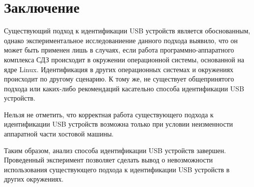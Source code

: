 \section{Заключение}
Существующий подход к идентификации USB устройств является обоснованным, однако экспериментальное исследованиение данного подхода выявило, что
он может быть применен лишь в случаях, если работа программно-аппаратного комплекса СДЗ происходит в окружении операционной системы,
основанной на ядре Linux. Идентификация в других операционных системах и окружениях происходит по другому сценарию. К тому же, не существует
общепринятого подхода или каких-либо рекомендаций касательно способа идентификации USB устройств.
\par
Нельзя не отметить, что корректная работа существующего подхода к идентификации USB устройств возможна только при условии неизменности
аппаратной части хостовой машины.
\par
Таким образом, анализ способа идентификации USB устройств завершен. Проведенный эксперимент позволяет сделать вывод о невозможности
использования существующего подхода к идентификации USB устройств в других окружениях.
\clearpage